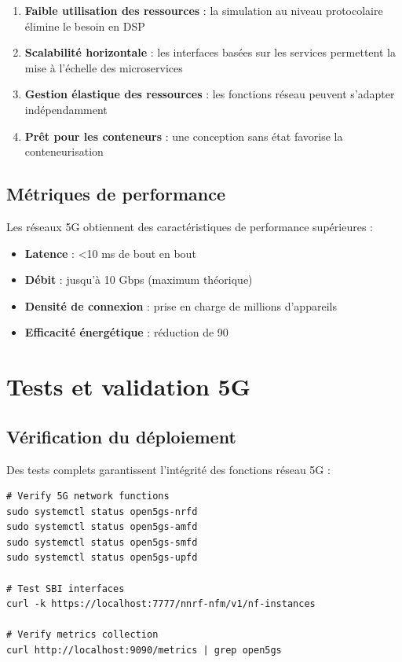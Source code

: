 \documentclass[12pt,a4paper]{report}
\begin{document}
\begin{enumerate}
    \item \textbf{Faible utilisation des ressources} : la simulation au niveau protocolaire élimine le besoin en DSP
    \item \textbf{Scalabilité horizontale} : les interfaces basées sur les services permettent la mise à l'échelle des microservices
    \item \textbf{Gestion élastique des ressources} : les fonctions réseau peuvent s'adapter indépendamment
    \item \textbf{Prêt pour les conteneurs} : une conception sans état favorise la conteneurisation
\end{enumerate}

\subsection{Métriques de performance}

Les réseaux 5G obtiennent des caractéristiques de performance supérieures :

\begin{itemize}
    \item \textbf{Latence} : <10 ms de bout en bout
    \item \textbf{Débit} : jusqu'à 10 Gbps (maximum théorique)
    \item \textbf{Densité de connexion} : prise en charge de millions d'appareils
    \item \textbf{Efficacité énergétique} : réduction de 90 %
\end{itemize}

\section{Tests et validation 5G}

\subsection{Vérification du déploiement}

Des tests complets garantissent l'intégrité des fonctions réseau 5G :

\begin{lstlisting}[caption=Vérification du déploiement 5G]
# Verify 5G network functions
sudo systemctl status open5gs-nrfd
sudo systemctl status open5gs-amfd
sudo systemctl status open5gs-smfd
sudo systemctl status open5gs-upfd

# Test SBI interfaces
curl -k https://localhost:7777/nnrf-nfm/v1/nf-instances

# Verify metrics collection
curl http://localhost:9090/metrics | grep open5gs
\end{lstlisting}
\end{document}
